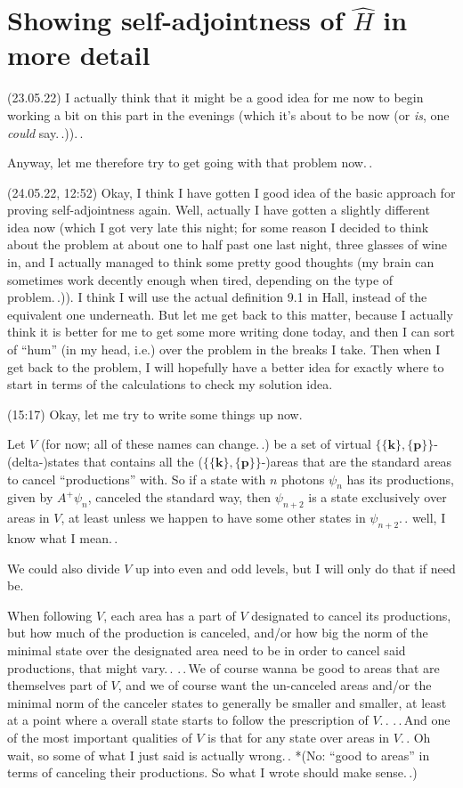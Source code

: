 \documentclass{report}
\begin{document}
\section{Showing self-adjointness of $\hat H$ in more detail}
(23.05.22) I actually think that it might be a good idea for me now to begin working a bit on this part in the evenings (which it's about to be now (or \emph{is}, one \emph{could} say.\,.)).\,. %

Anyway, let me therefore try to get going with that problem now.\,. 

(24.05.22, 12:52) Okay, I think I have gotten I good idea of the basic approach for proving self-adjointness again. Well, actually I have gotten a slightly different idea now (which I got very late this night; for some reason I decided to think about the problem at about one to half past one last night, three glasses of wine in, and I actually managed to think some pretty good thoughts (my brain can sometimes work decently enough when tired, depending on the type of problem.\,.)). I think I will use the actual definition 9.1 in Hall, instead of the equivalent one underneath. But let me get back to this matter, because I actually think it is better for me to get some more writing done today, and then I can sort of ``hum'' (in my head, i.e.) over the problem in the breaks I take. Then when I get back to the problem, I will hopefully have a better idea for exactly where to start in terms of the calculations to check my solution idea. %

(15:17) Okay, let me try to write some things up now.

Let $V$ (for now; all of these names can change.\,.) be a set of virtual $\{\{\mathbf{k}\}, \{\mathbf{p}\}\}$-(delta-)states that contains all the ($\{\{\mathbf{k}\}, \{\mathbf{p}\}\}$-)areas that are the standard areas to cancel ``productions'' with. So if a state with $n$ photons $\psi_n$ has its productions, given by $A^+ \psi_n$, canceled the standard way, then $\psi_{n+2}$ is a state exclusively over areas in $V$, at least unless we happen to have some other states in $\psi_{n+2}$.\,. well, I know what I mean.\,. 

We could also divide $V$ up into even and odd levels, but I will only do that if need be. 

When following $V$, each area has a part of $V$ designated to cancel its productions, but how much of the production is canceled, and/or how big the norm of the minimal state over the designated area need to be in order to cancel said productions, that might vary.\,. .\,.\,We of course wanna be good to areas that are themselves part of $V$, and we of course want the un-canceled areas and/or the minimal norm of the canceler states to generally be smaller and smaller, at least at a point where a overall state starts to follow the prescription of $V$.\,. .\,.\,And one of the most important qualities of $V$ is that for any state over areas in $V$.\,. Oh wait, so some of what I just said is actually wrong.\,. *(No: ``good to areas'' in terms of canceling their productions. So what I wrote should make sense.\,.)
\end{document}
